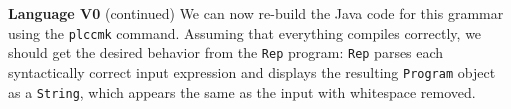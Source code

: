 \begin{minipage}[t]{\sw}
\slidenumber
\LARGE
{\bf Language V0} (continued)\exx
We can now re-build the Java code for this grammar
using the \verb'plccmk' command.
Assuming that everything compiles correctly,
we should get the desired behavior from the \verb'Rep' program:
\verb'Rep' parses each syntactically correct input expression and
displays the resulting \verb'Program' object as a \verb'String',
which appears the same as the input with whitespace removed.
\end{minipage}
\clearpage
